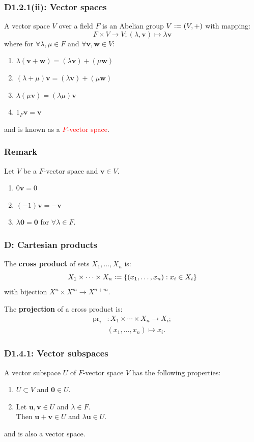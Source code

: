 \documentclass{article}
\newcommand{\deq}{\vcentcolon=}
\newcommand{\vc}[1]{\boldsymbol{#1}}
\begin{document}
\begin{multicols*}{3}
\subsubsection*{D1.2.1(ii): Vector spaces}
A vector space $V$ over a field $F$ is an Abelian group $V\deq(V,+)$
with mapping:
$$F\times V\rightarrow V;
(\lambda,\vc{v})\mapsto
\lambda\vc{v}$$
where for $\forall\lambda, \mu\in F$ and
$\forall\vc{v},\vc{w}\in V$:
\begin{enumerate}
    \item
    $\lambda(\vc{v}+\vc{w})
    =(\lambda\vc{v})+(\mu\vc{w})$

    \item $(\lambda+\mu)\vc{v}
    =(\lambda\vc{v})+(\mu\vc{w})$

    \item $\lambda(\mu\vc{v})=(\lambda\mu)\vc{v}$
    
    \item $1_F\vc{v}=\vc{v}$
\end{enumerate}
and is known as a \textcolor{red}{$F$-vector space}.

\subsubsection*{Remark}
Let $V$ be a $F$-vector space and $\vc{v}\in V$.
\begin{enumerate}
    \item $0\vc{v}=0$
    \item $(-1)\vc{v}=-\vc{v}$
    \item $\lambda\vc{0}=\vc{0}$
    for $\forall\lambda\in F$.
\end{enumerate}

\subsubsection*{D: Cartesian products}
The \textbf{cross product} of sets $X_1,\dots,X_n$ is:
$$X_1\times\cdots\times X_n
\deq\{(x_1,\dots,x_n):x_i\in X_i\}$$
with bijection $X^n\times X^m\rightarrow X^{n+m}$.

The \textbf{projection} of a cross product is:
\begin{align*}
    \text{pr}_i &:X_1\times\cdots\times X_n
    \rightarrow X_i; \\
    &(x_1,\dots,x_n)\mapsto x_i.
\end{align*}

\subsubsection*{D1.4.1: Vector subspaces}
A vector subspace $U$ of $F$-vector space $V$
has the following properties:
\begin{enumerate}
    \item $U\subset V$ and $\vc{0}\in U$.
    \item Let $\vc{u},\vc{v}\in U$
    and $\lambda\in F$. \\ Then
    $\vc{u}+\vc{v}\in U$ and $\lambda\vc{u}\in U$.
\end{enumerate}
and is also a vector space.


\end{multicols*}
\end{document}
